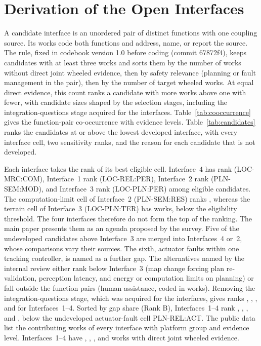 \documentclass[journal]{IEEEtran}
\begin{document}


\section{Derivation of the Open Interfaces}
\label{supp:interfaces}

A candidate interface is an unordered pair of distinct functions with one coupling source. Its works code both functions and address, name, or report the source. The rule, fixed in codebook version 1.0 before coding (commit 67872f4), keeps candidates with at least three works and sorts them by the number of works without direct joint wheeled evidence, then by safety relevance (planning or fault management in the pair), then by the number of target wheeled works. At equal direct evidence, this count ranks a candidate with more works above one with fewer, with candidate sizes shaped by the selection stages, including the integration-questions stage acquired for the interfaces. Table~\ref{tab:cooccurrence} gives the function-pair co-occurrence with evidence levels. Table~\ref{tab:candidates} ranks the candidates at or above the lowest developed interface, with every interface cell, two sensitivity ranks, and the reason for each candidate that is not developed.

Each interface takes the rank of its best eligible cell. Interface~4 has rank \IfaceFourRank{} (LOC-MRC:COM), Interface~1 rank \IfaceOneRank{} (LOC-REL:PER), Interface~2 rank \IfaceTwoRank{} (PLN-SEM:MOD), and Interface~3 rank \IfaceThreeRank{} (LOC-PLN:PER) among \CandidateCount{} eligible candidates. The computation-limit cell of Interface~2 (PLN-SEM:RES) ranks \IfaceTwoResRank{}, whereas the terrain cell of Interface~3 (LOC-PLN:TER) has \IfaceThreeTerWorks{} works, below the eligibility threshold. The four interfaces therefore do not form the top of the ranking. The main paper presents them as an agenda proposed by the survey. Five of the \RejectedCount{} undeveloped candidates above Interface~3 are merged into Interfaces~4 or~2, whose comparisons vary their sources. The sixth, actuator faults within one tracking controller, is named as a further gap. The alternatives named by the internal review either rank below Interface~3 (map change forcing plan re-validation, perception latency, and energy or computation limits on planning) or fall outside the function pairs (human assistance, coded in \HumanAssistCount{} works). Removing the integration-questions stage, which was acquired for the interfaces, gives ranks \IfaceOneRankA{}, \IfaceTwoRankA{}, \IfaceThreeRankA{}, and \IfaceFourRankA{} for Interfaces~1--4. Sorted by gap share (Rank B), Interfaces~1--4 rank \IfaceOneRankB{}, \IfaceTwoRankB{}, \IfaceThreeRankB{}, and \IfaceFourRankB{}, below the undeveloped actuator-fault cell PLN-REL:ACT. The public data list the contributing works of every interface with platform group and evidence level. Interfaces~1--4 have \IfaceOneDirect{}, \IfaceTwoDirect{}, \IfaceThreeDirect{}, and \IfaceFourDirect{} works with direct joint wheeled evidence.






\end{document}
